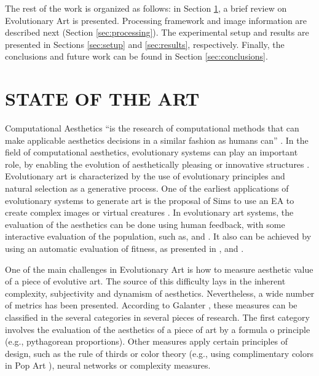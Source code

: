 \documentclass[a4paper,twoside]{article}
\begin{document}
The rest of the work is organized as follows: in Section \ref{sec:soa}, a brief review on Evolutionary Art is presented. Processing framework and image information are described next (Section \ref{sec:processing}). The experimental setup and results are presented in Sections \ref{sec:setup} and \ref{sec:results}, respectively. Finally, the conclusions and future work can be found in Section \ref{sec:conclusions}.

\section{\uppercase{STATE OF THE ART}}
\label{sec:soa}
\noindent Computational Aesthetics ``is the research of computational methods that can make applicable aesthetics decisions in a similar fashion as humans can'' \cite{COMPAESTH}. In the field of computational aesthetics, evolutionary systems can play an important role, by enabling the evolution of aesthetically pleasing or innovative structures \cite{dipaola2009incorporating}. Evolutionary art is characterized by the use of evolutionary principles and natural selection as a generative process. One of the earliest applications of evolutionary systems to generate art is the proposal of Sims to use an EA to create complex images \cite{sims1991artificial} or virtual creatures  \cite{sims1994evolving}. In evolutionary art systems, the evaluation of the aesthetics can be done using human feedback, with some interactive evaluation of the population, such as, \cite{ashlock2006evolutionary,draves2006electric,moroni2000vox} and \cite{sims1991artificial}. It also can be achieved by using an automatic evaluation of fitness, as presented in \cite{aguilar2008robotic,den2010comparing,dipaola2009incorporating,li2012investigating}, and \cite{sims1994evolving}.

One of the main challenges in Evolutionary Art is how to measure aesthetic value of a piece of evolutive art. The source of this difficulty lays in the inherent complexity, subjectivity and dynamism of aesthetics. Nevertheless, a wide number of metrics has been presented. According to Galanter \cite{galanter2012computational}, these measures can be classified in the several categories in several pieces of research. The first category involves the evaluation of the aesthetics of a piece of art by a formula o principle (e.g., pythagorean proportions). Other measures apply certain principles of design, such as the rule of thirds or color theory (e.g., using complimentary colors in Pop Art \cite{den2012evolving}), neural networks or complexity measures. 
\end{document}
